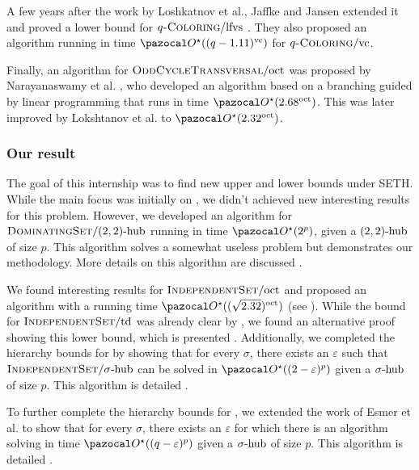 \medskip

A few years after the work by Loshkatnov et al., Jaffke and Jansen extended it and proved a lower bound for $q\prob{-Coloring}/\lfvs$ \cite{jaffke2017fine}. They also proposed an algorithm running in time $\O^\star((q - 1.11)^\vc)$ for $q\prob{-Coloring}/\vc$.

\medskip

Finally, an algorithm for $\prob{OddCycleTransversal}/\oct$ was proposed by Narayanaswamy et al. \cite{narayanaswamy2012lp}, who developed an algorithm based on a branching guided by linear programming that runs in time $\O^\star(2.68^\oct)$. This was later improved by Lokshtanov et al. \cite{lokshtanov2012subexponential} to $\O^\star(2.32^\oct)$. 

\subsubsection*{Our result}


The goal of this internship was to find new upper and lower bounds under SETH. While the main focus was initially on , we didn't achieved new interesting results for this problem. However, we developed an algorithm for $\prob{DominatingSet}/\sdhub[2, 2]$ running in time $\O^\star(2^p)$, given a $\sdhub[2,2]$ of size $p$. This algorithm solves a somewhat useless problem but demonstrates our methodology. More details on this algorithm are discussed .

\medskip

We found interesting results for $\prob{IndependentSet}/\oct$ and proposed an algorithm with a running time $\O^\star((\sqrt{2.32})^\oct)$ (see ). While the bound for $\prob{IndependentSet}/\td$ was already clear by , we found an alternative proof showing this lower bound, which is presented . Additionally, we completed the hierarchy bounds for  by showing that for every $\sigma$, there exists an $\varepsilon$ such that $\prob{IndependentSet}/\shub$ can be solved in $\O^\star((2- \varepsilon)^p)$ given a $\shub$ of size $p$. This algorithm is detailed .

\medskip

To further complete the hierarchy bounds for , we extended the work of Esmer et al. to show that for every $\sigma$, there exists an $\varepsilon$ for which there is an algorithm solving  in time $\O^\star((q-\varepsilon)^p)$ given a $\shub$ of size $p$. This algorithm is detailed .